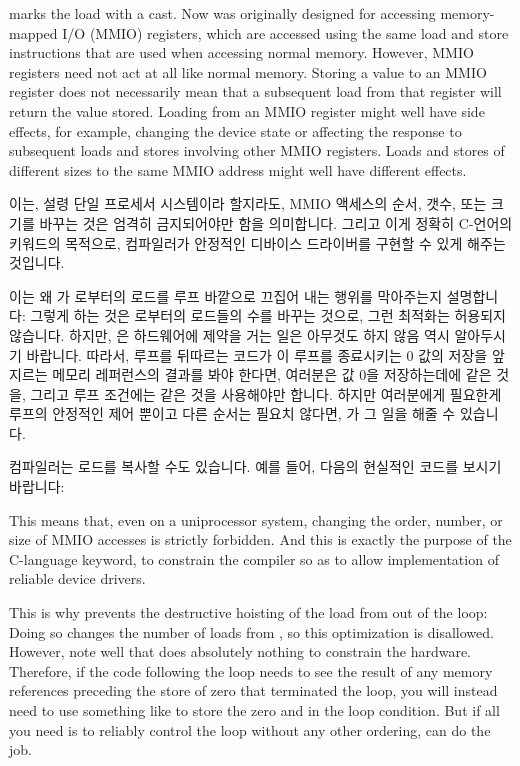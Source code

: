  marks the load with a  cast.
Now  was originally designed for accessing
memory-mapped I/O (MMIO) registers, which are accessed using
the same load and store instructions that are used when
accessing normal memory.
However, MMIO registers need not act at all like normal memory.
Storing a value to an MMIO register does not necessarily mean
that a subsequent load from that register will return the value
stored.
Loading from an MMIO register might well have side effects,
for example, changing the device state or affecting the response
to subsequent loads and stores involving other MMIO registers.
Loads and stores of different sizes to the same MMIO address
might well have different effects.
\fi

이는, 설령 단일 프로세서 시스템이라 할지라도, MMIO 액세스의 순서, 갯수, 또는
크기를 바꾸는 것은 엄격히 금지되어야만 함을 의미합니다.
그리고 이게 정확히 C-언어의  키워드의 목적으로, 컴파일러가
안정적인 디바이스 드라이버를 구현할 수 있게 해주는 것입니다.

이는 왜  가  로부터의 로드를 루프 바깥으로 끄집어 내는
행위를 막아주는지 설명합니다:  그렇게 하는 것은  로부터의 
로드들의 수를 바꾸는 것으로, 그런 최적화는 허용되지 않습니다.
하지만,  은 하드웨어에 제약을 거는 일은 아무것도 하지 않음 역시
알아두시기 바랍니다.
따라서, 루프를 뒤따르는 코드가 이 루프를 종료시키는 0 값의 저장을 앞지르는
메모리 레퍼런스의 결과를 봐야 한다면, 여러분은 값 0을 저장하는데에
 같은 것을, 그리고 루프 조건에는
 같은 것을 사용해야만 합니다.
하지만 여러분에게 필요한게 루프의 안정적인 제어 뿐이고 다른 순서는 필요치
않다면,  가 그 일을 해줄 수 있습니다.

컴파일러는 로드를 복사할 수도 있습니다.
예를 들어, 다음의 현실적인 코드를 보시기 바랍니다:
\iffalse

This means that, even on a uniprocessor system, changing the
order, number, or size of MMIO accesses is strictly forbidden.
And this is exactly the purpose of the C-language  keyword,
to constrain the compiler so as to allow implementation of reliable device
drivers.

This is why  prevents the destructive hoisting of
the load from  out of the loop:  Doing so changes the number
of  loads from , so this optimization is disallowed.
However, note well that  does absolutely nothing to
constrain the hardware.
Therefore, if the code following the loop needs to see the result of
any memory references preceding the store of zero that terminated
the loop, you will instead need to use something like
 to store the zero and 
in the loop condition.
But if all you need is to reliably control the loop without any
other ordering,  can do the job.

